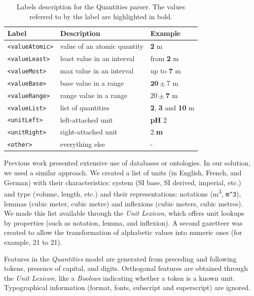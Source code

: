 \begin{table}[htbp]
\centering
  \caption{Labels description for the Quantities parser. The values referred to by the label are highlighted in bold.}
  \label{tab:quantities-model-labels}
  \begin{tabular}{lll}
    \toprule
    Label & Description & Example\\
    \midrule
    \texttt{<valueAtomic>} & value of an atomic quantity & \textbf{2} m \\
    \texttt{<valueLeast>} & least value in an interval & from \textbf{2} m \\
    \texttt{<valueMost>} & max value in an interval & up to \textbf{7} m \\
    \texttt{<valueBase>} & base value in a range & $\textbf{20}\pm7$ m \\
    \texttt{<valueRange>} & range value in a range & $20 \pm \textbf{7}$ m \\
    \texttt{<valueList>} & list of quantities & \textbf{2}, \textbf{3} and \textbf{10} m \\
    \texttt{<unitLeft>} & left-attached unit & \textbf{pH} 2 \\
    \texttt{<unitRight>} & right-attached unit & 2 \textbf{m} \\
    \texttt{<other>} & everything else & - \\
  \bottomrule
\end{tabular}
\end{table}

Previous work presented extensive use of databases or ontologies. In our solution, we used a similar approach. We created a list of units (in English, French, and German) with their characteristics: system (SI base, SI derived, imperial, etc.) and type (volume, length, etc.) and their representations: notations (m\textsuperscript{3}, \texttt{m\^{}3}), lemmas (cubic meter, cubic metre) and inflexions (cubic meters, cubic metres). We made this list available through the \textit{Unit Lexicon}, which offers unit lookups by properties (such as notation, lemma, and inflexion). A second gazetteer was created to allow the transformation of alphabetic values into numeric ones (for example, 21 to 21).

Features in the \textit{Quantities} model are generated from preceding and following tokens, presence of capital, and digits. Orthogonal features are obtained through the \textit{Unit Lexicon}, like a \textit{Boolean} indicating whether a token is a known unit. Typographical information (format, fonts, subscript and superscript) are ignored. 

